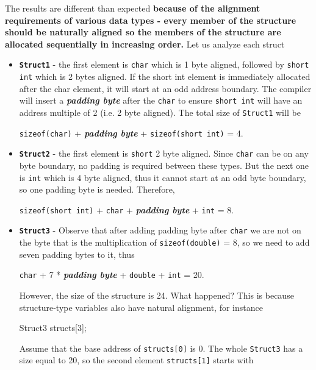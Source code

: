 \documentclass[../main]{subfiles}
\begin{document}
    The results are different than expected \textbf{because of the alignment requirements of various data types - every member of the structure should be naturally aligned so
the members of the structure are allocated sequentially in increasing order.} Let us analyze each struct
\begin{itemize}
    \item \textbf{\texttt{Struct1}} - the first element is \texttt{char} which is 1 byte aligned, followed by \texttt{short int} which is 2 bytes aligned.
    If the short int element is immediately allocated after the char element, it will start at an odd address boundary. The compiler will insert a \textbf{\textit{padding byte}}
    after the \texttt{char} to ensure \texttt{short int} will have an address multiple of 2 (i.e. 2 byte aligned). The total size of \texttt{Struct1} will be
    \begin{center}
        \texttt{sizeof(char)} + \textbf{\textit{padding byte}} + \texttt{sizeof(short int)} = 4.
    \end{center}
    \item \textbf{\texttt{Struct2}} - the first element is \texttt{short} 2 byte aligned. Since \texttt{char} can be on any byte boundary, no padding is required between these types.
    But the next one is \texttt{int} which is 4 byte aligned, thus it cannot start at an odd byte boundary, so one padding byte is needed. Therefore,
    \begin{center}
        \texttt{sizeof(short int)} + \texttt{char} + \textbf{\textit{padding byte}} + \texttt{int} = 8.
    \end{center}
    \item \textbf{\texttt{Struct3}} - Observe that after adding padding byte after \texttt{char} we are not on the byte that is the multiplication of \texttt{sizeof(double)} = 8, so we need
    to add seven padding bytes to it, thus
    \begin{center}
        \texttt{char} + 7 * \textbf{\textit{padding byte}} + \texttt{double} + \texttt{int} = 20.
    \end{center} However, the size of the structure is 24. What happened? This is because structure-type variables also have natural alignment, for instance
    \begin{Code}
        Struct3 structs[3];
    \end{Code}
    Assume that the base address of \texttt{structs[0]} is 0. The whole \texttt{Struct3} has a size equal to 20, so the second element \texttt{structs[1]} starts with

\end{itemize}
\end{document}
